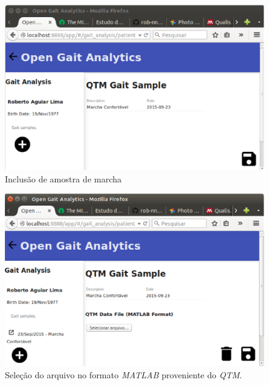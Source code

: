 \begin{figure}[ht]
	\centering
	\includegraphics[width=15cm]{figuras/tela5.eps}
	\caption{Inclusão de amostra de marcha}

	\label{tela5}
\end{figure}


\begin{figure}[ht]
	\centering
	\includegraphics[width=15cm]{figuras/tela6.eps}
	\caption{Seleção do arquivo no formato \emph{MATLAB} proveniente do \emph{QTM}.}
	\label{tela6}
\end{figure}


